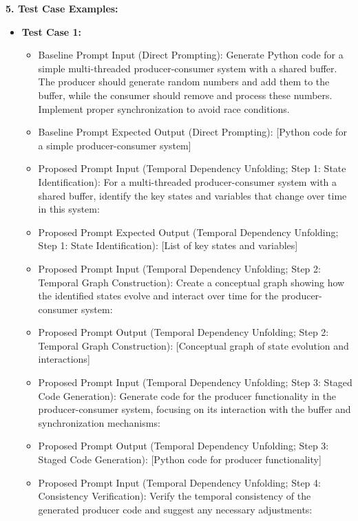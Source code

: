 \begin{tcolorbox}[colback=blue!5!white,colframe=blue!75!black,title=\textbf{Temporal Dependency Unfolding: Improving Code Generation for Complex Stateful Systems (Part 3)}]
\small{
\textbf{5. Test Case Examples:}
\begin{itemize}
    \item \textbf{Test Case 1:}
    \begin{itemize}
        \item Baseline Prompt Input (Direct Prompting): Generate Python code for a simple multi-threaded producer-consumer system with a shared buffer. The producer should generate random numbers and add them to the buffer, while the consumer should remove and process these numbers. Implement proper synchronization to avoid race conditions.
        \item Baseline Prompt Expected Output (Direct Prompting): [Python code for a simple producer-consumer system]
        \item Proposed Prompt Input (Temporal Dependency Unfolding; Step 1: State Identification): For a multi-threaded producer-consumer system with a shared buffer, identify the key states and variables that change over time in this system:
        \item Proposed Prompt Expected Output (Temporal Dependency Unfolding; Step 1: State Identification): [List of key states and variables]
        \item Proposed Prompt Input (Temporal Dependency Unfolding; Step 2: Temporal Graph Construction): Create a conceptual graph showing how the identified states evolve and interact over time for the producer-consumer system:
        \item Proposed Prompt Output (Temporal Dependency Unfolding; Step 2: Temporal Graph Construction): [Conceptual graph of state evolution and interactions]
        \item Proposed Prompt Input (Temporal Dependency Unfolding; Step 3: Staged Code Generation): Generate code for the producer functionality in the producer-consumer system, focusing on its interaction with the buffer and synchronization mechanisms:
        \item Proposed Prompt Output (Temporal Dependency Unfolding; Step 3: Staged Code Generation): [Python code for producer functionality]
        \item Proposed Prompt Input (Temporal Dependency Unfolding; Step 4: Consistency Verification): Verify the temporal consistency of the generated producer code and suggest any necessary adjustments:

\end{itemize}
\end{itemize}}
\end{tcolorbox}
